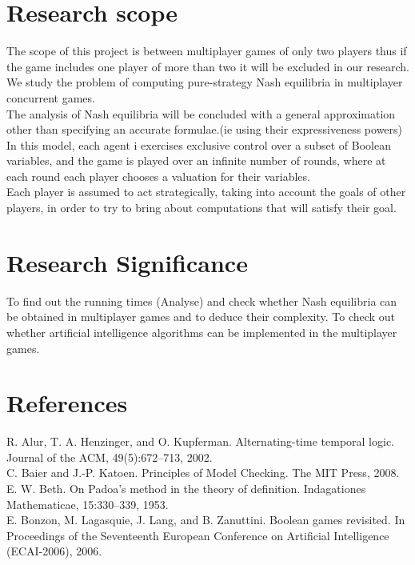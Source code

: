 \documentclass[14pt, a4paper]{article}
\begin{document}
			
			\section{Research scope}
			
				The scope of this project is between multiplayer games of only two players thus if the game includes one player of more than two it will be excluded in our research.\\
	We study the problem of computing pure-strategy Nash equilibria in multiplayer concurrent games.\\
	The analysis of Nash equilibria will be concluded with a general approximation other than specifying an accurate formulae.(ie using their expressiveness powers)\\

	In this model, each agent i exercises exclusive control over a subset of Boolean variables, and the game is played over an infinite number of rounds, where at each round each player chooses a valuation for their variables.\\

	Each player is assumed to act strategically, taking into account the goals of other players,
in order to try to bring about computations that will satisfy their goal.\\

			
			\section{Research Significance}
			
				To find out the running times (Analyse) and check whether Nash equilibria can be obtained in multiplayer games and to deduce their complexity.
				To check out whether artificial intelligence algorithms can be implemented in the multiplayer 
games.

			
			\section{References}
R. Alur, T. A. Henzinger, and O. Kupferman. Alternating-time
temporal logic. Journal of the ACM, 49(5):672–713, 2002.\\
C. Baier and J.-P. Katoen. Principles of Model Checking. The
MIT Press, 2008.\\
E. W. Beth. On Padoa’s method in the theory of definition.
Indagationes Mathematicae, 15:330–339, 1953.\\
E. Bonzon, M. Lagasquie, J. Lang, and B. Zanuttini. Boolean
games revisited. In Proceedings of the Seventeenth European
Conference on Artificial Intelligence (ECAI-2006), 2006.\\
				
	

	
\end{document}
